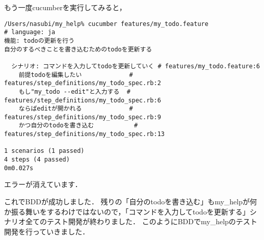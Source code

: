 もう一度cucumberを実行してみると，
\begin{lstlisting}[style=customCsh]
/Users/nasubi/my_help% cucumber features/my_todo.feature 
# language: ja
機能: todoの更新を行う
自分のするべきことを書き込むためのtodoを更新する

  シナリオ: コマンドを入力してtodoを更新していく # features/my_todo.feature:6
    前提todoを編集したい             # features/step_definitions/my_todo_spec.rb:2
    もし"my_todo --edit"と入力する  # features/step_definitions/my_todo_spec.rb:6
    ならばeditが開かれる             # features/step_definitions/my_todo_spec.rb:9
    かつ自分のtodoを書き込む           # features/step_definitions/my_todo_spec.rb:13

1 scenarios (1 passed)
4 steps (4 passed)
0m0.027s
\end{lstlisting}
エラーが消えています．

これでBDDが成功しました．
残りの「自分のtodoを書き込む」もmy\_helpが何か振る舞いをするわけではないので，「コマンドを入力してtodoを更新する」シナリオ全てのテスト開発が終わりました．
このようにBDDでmy\_helpのテスト開発を行っていきました．

